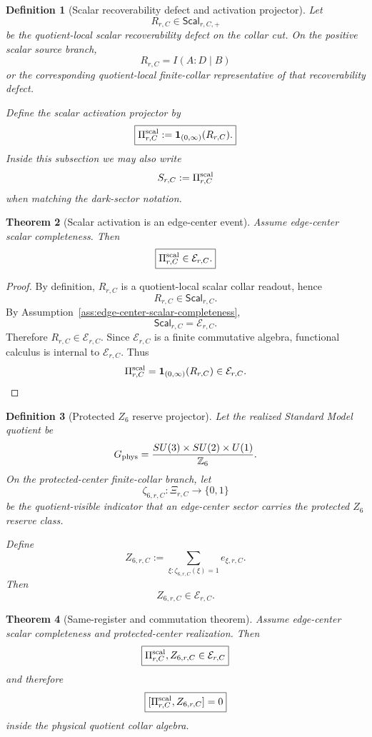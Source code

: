 \documentclass[11pt]{article}
\newtheorem{theorem}{Theorem}[section]
\newtheorem{definition}[theorem]{Definition}
\theoremstyle{remark}
\theoremstyle{plain}
\begin{document}
\begin{definition}[Scalar recoverability defect and activation projector]
\label{def:scalar-activation-projector}
Let
\[
R_{r,C}\in\mathsf{Scal}_{r,C,+}
\]
be the quotient-local scalar recoverability defect on the collar cut. On the
positive scalar source branch,
\[
R_{r,C}=I(A:D\mid B)
\]
or the corresponding quotient-local finite-collar representative of that
recoverability defect.

Define the scalar activation projector by
\[
\boxed{
\Pi^{\rm scal}_{r,C}
:=
\mathbf 1_{(0,\infty)}(R_{r,C}).
}
\]
Inside this subsection we may also write
\[
S_{r,C}:=\Pi^{\rm scal}_{r,C}
\]
when matching the dark-sector notation.
\end{definition}

\begin{theorem}[Scalar activation is an edge-center event]
\label{thm:scalar-activation-edge-center}
Assume edge-center scalar completeness. Then
\[
\boxed{
\Pi^{\rm scal}_{r,C}\in\mathcal E_{r,C}.
}
\]
\end{theorem}

\begin{proof}
By definition, \(R_{r,C}\) is a quotient-local scalar collar readout, hence
\[
R_{r,C}\in\mathsf{Scal}_{r,C}.
\]
By Assumption~\ref{ass:edge-center-scalar-completeness},
\[
\mathsf{Scal}_{r,C}=\mathcal E_{r,C}.
\]
Therefore \(R_{r,C}\in\mathcal E_{r,C}\). Since \(\mathcal E_{r,C}\) is a
finite commutative algebra, functional calculus is internal to
\(\mathcal E_{r,C}\). Thus
\[
\Pi^{\rm scal}_{r,C}
=
\mathbf 1_{(0,\infty)}(R_{r,C})
\in
\mathcal E_{r,C}.
\]
\end{proof}

\begin{definition}[Protected \(Z_6\) reserve projector]
\label{def:z6-reserve-projector}
Let the realized Standard Model quotient be
\[
G_{\rm phys}
=
\frac{SU(3)\times SU(2)\times U(1)}{\mathbb Z_6}.
\]
On the protected-center finite-collar branch, let
\[
\zeta_{6,r,C}:\Xi_{r,C}\to\{0,1\}
\]
be the quotient-visible indicator that an edge-center sector carries the
protected \(Z_6\) reserve class.

Define
\[
\boxed{
Z_{6,r,C}
:=
\sum_{\xi:\zeta_{6,r,C}(\xi)=1}e_{\xi,r,C}.
}
\]
Then
\[
Z_{6,r,C}\in\mathcal E_{r,C}.
\]
\end{definition}

\begin{theorem}[Same-register and commutation theorem]
\label{thm:scalar-z6-same-register-commute}
Assume edge-center scalar completeness and protected-center realization. Then
\[
\boxed{
\Pi^{\rm scal}_{r,C},Z_{6,r,C}\in\mathcal E_{r,C}
}
\]
and therefore
\[
\boxed{
[\Pi^{\rm scal}_{r,C},Z_{6,r,C}]=0
}
\]
inside the physical quotient collar algebra.
\end{theorem}
\end{document}
